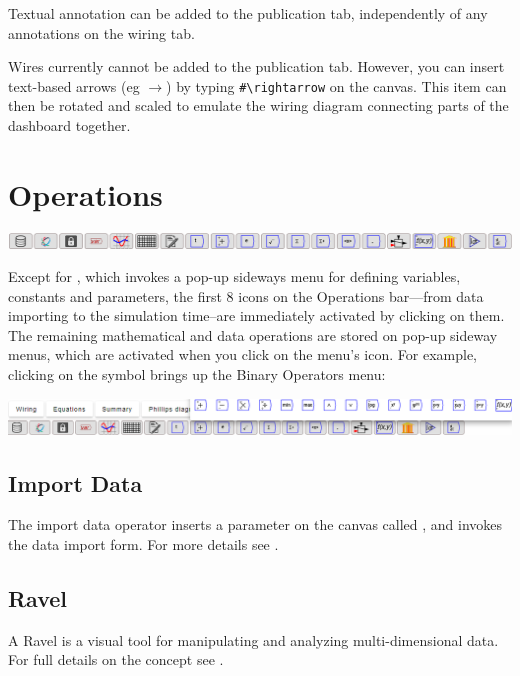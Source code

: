 Textual annotation can be added to the publication tab, independently
of any annotations on the wiring tab.

Wires currently cannot be added to the publication tab. However, you
can insert text-based arrows (eg $\rightarrow$) by typing \verb+#\rightarrow+
on the canvas. This item can then be rotated and scaled to emulate the wiring
diagram connecting parts of the dashboard together.

\section{Operations}

\label{Operations}

\noindent\includegraphics[width=\textwidth]{images/DesignIcons}

Except for , which invokes a pop-up sideways
menu for defining variables, constants and parameters, the first 8
icons on the Operations bar---from data importing to the simulation
time--are immediately activated by clicking on them. The remaining
mathematical and data operations are stored on pop-up sideway menus,
which are activated when you click on the menu's icon. For example,
clicking on the  symbol brings up the
Binary Operators menu:

\noindent\includegraphics[width=\textwidth]{images/DesignIconsWithBinaryOperatorsMenu}

\subsection{Import Data}

The import data operator  inserts
a parameter on the canvas called ,
and invokes the data import form. For more details see .

\subsection{Ravel}

A Ravel is a visual tool for manipulating and analyzing multi-dimensional
data. For full details on the concept see .

